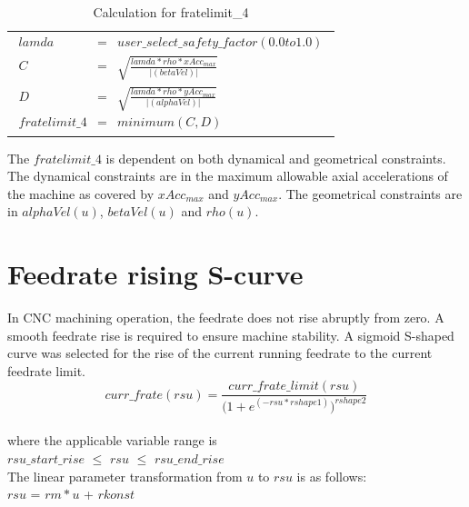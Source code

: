 \begin{table}[ht]
\begin{center}
\begin{tabular}{ p{16.0cm} }
\caption{Calculation for fratelimit\_4}
\begin{eqnarray}
	lamda  & = & user\_select\_safety\_factor(0.0 to 1.0)     \nonumber \\
	C & = & \sqrt {\frac{lamda*rho*xAcc_{max}} { \Bigg |(betaVel) \Bigg |} } \nonumber \\
	D & = & \sqrt {\frac{lamda*rho*yAcc_{max}} { \Bigg |(alphaVel)\Bigg |} } \nonumber \\
    fratelimit\_4 & = & minimum (C, D) \nonumber
\end{eqnarray}
\end{tabular}
\end{center}
\end{table}

The $fratelimit\_4$ is dependent on both dynamical and geometrical constraints. The dynamical constraints are in the maximum allowable axial accelerations of the machine as covered by $xAcc_{max}$ and $yAcc_{max}$. The geometrical constraints are in $alphaVel(u)$, $betaVel(u)$ and $rho(u)$.  \\

\clearpage
\pagebreak


\section{Feedrate rising S-curve}

In CNC machining operation, the feedrate does not rise abruptly from zero. A smooth feedrate rise is required to ensure machine stability. 
A sigmoid S-shaped curve was selected for the rise of the current running feedrate to the current feedrate limit. \\

\[ curr\_frate(rsu) = \frac{curr\_frate\_limit(rsu)} { \Bigg( 1 + e^{(-rsu*rshape1)} \Bigg) ^{rshape2} }  \] \\

\noindent
where the applicable variable range is \\
$rsu\_start\_rise$ $\le$ $rsu$ $\le$ $rsu\_end\_rise$\\

\noindent
The linear parameter transformation from $u$ to $rsu$ is as follows:\\
$rsu$ = $rm*u$ + $rkonst$ \\

